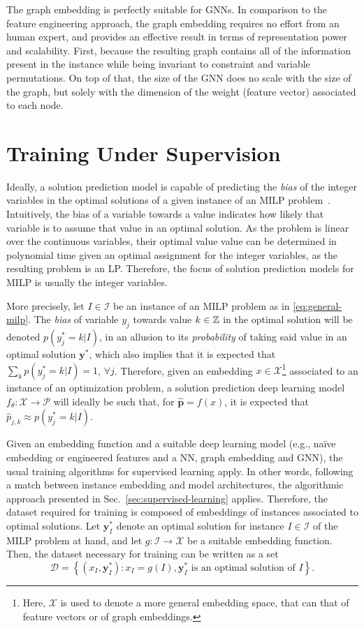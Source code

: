 The graph embedding is perfectly suitable for GNNs.
In comparison to the feature engineering approach, the graph embedding requires no effort from an human expert, and provides an effective result in terms of representation power and scalability.
First, because the resulting graph contains all of the information present in the instance while being invariant to constraint and variable permutations.
On top of that, the size of the GNN does no scale with the size of the graph, but solely with the dimension of the weight (feature vector) associated to each node.


\section{Training Under Supervision}

Ideally, a solution prediction model is capable of predicting the \emph{bias} of the integer variables in the optimal solutions of a given instance of an MILP problem~\cite{khalilMIPGNNDataDrivenFramework2022}.
Intuitively, the bias of a variable towards a value indicates how likely that variable is to assume that value in an optimal solution.
As the problem is linear over the continuous variables, their optimal value value can be determined in polynomial time given an optimal assignment for the integer variables, as the resulting problem is an LP.
Therefore, the focus of solution prediction models for MILP is usually the integer variables.

More precisely, let $I\in \mathcal{I}$ be an instance of an MILP problem as in \eqref{eq:general-milp}.
The \emph{bias} of variable $y_j$ towards value $k\in \mathbb{Z}$ in the optimal solution will be denoted $p(y_j^*=k|I)$, in an allusion to its \emph{probability} of taking said value in an optimal solution $\bm{y}^*$, which also implies that it is expected that $\sum_{k} p(y_j^*=k|I) = 1$, $\forall j$.
Therefore, given an embedding $x\in \mathcal{X}$\footnote{Here, $\mathcal{X}$ is used to denote a more general embedding space, that can that of feature vectors or of graph embeddings.} associated to an instance of an optimization problem, a solution prediction deep learning model $f_{\theta}: \mathcal{X} \longrightarrow \mathcal{P}$ will ideally be such that, for $\hat{\bm{p}}=f(x)$, it is expected that $\hat{p}_{j,k}\approx p(y_j^*=k|I)$.

Given an embedding function and a suitable deep learning model (e.g., naïve embedding or engineered features and a NN, graph embedding and GNN), the usual training algorithms for supervised learning apply.
In other words, following a match between instance embedding and model architectures, the algorithmic approach presented in Sec.~\ref{sec:supervised-learning} applies.
Therefore, the dataset required for training is composed of embeddings of instances associated to optimal solutions.
Let $\bm{y}^{*}_I$ denote an optimal solution for instance $I\in \mathcal{I}$ of the MILP problem at hand, and let $g: \mathcal{I} \longrightarrow \mathcal{X}$ be a suitable embedding function.
Then, the dataset necessary for training can be written as a set \[
    \mathcal{D} = \left\{ (x_I, \bm{y}^{*}_I) : x_I = g(I), \bm{y}^*_I\text{ is an optimal solution of }I \right\} 
.\] 

